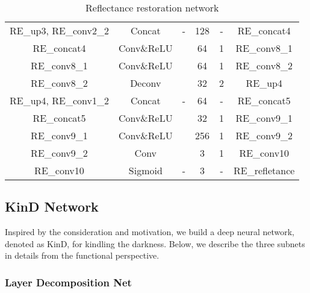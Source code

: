\documentclass[journal,10pt,compsoc]{IEEEtran}
\begin{document}
\begin{table}
{\begin{tabular}{cccccc}
			RE\_up3, RE\_conv2\_2 & Concat & - & 128 & - & RE\_concat4 \\
			RE\_concat4 & Conv\&ReLU &  & 64 & 1 & RE\_conv8\_1 \\
			RE\_conv8\_1 & Conv\&ReLU &  & 64 & 1 & RE\_conv8\_2 \\
			RE\_conv8\_2 & Deconv &  & 32 & 2 & RE\_up4 \\
			RE\_up4, RE\_conv1\_2 & Concat & - & 64 & - & RE\_concat5 \\
			RE\_concat5 & Conv\&ReLU &  & 32 & 1 & RE\_conv9\_1 \\
			RE\_conv9\_1 & Conv\&ReLU &  & 256 & 1 & RE\_conv9\_2 \\
			RE\_conv9\_2 & Conv &  & 3 & 1 & RE\_conv10 \\
			RE\_conv10 & Sigmoid & - & 3 & - & RE\_refletance \\
			\hline
		\end{tabular}
	}
	\caption{Reflectance restoration network}
	\label{tab:RR}
\end{table}


\subsection{KinD Network}
Inspired by the consideration and motivation, we build a deep neural network, denoted as KinD, for kindling the darkness. Below, we describe the three subnets in details from the functional perspective. 
\subsubsection{Layer Decomposition Net}
\end{document}
